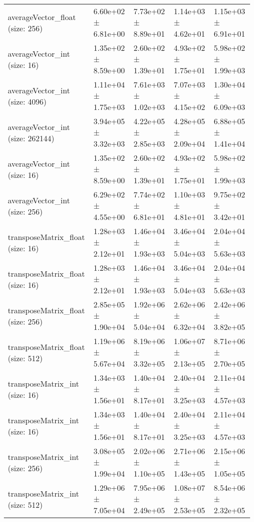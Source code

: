 \begin{tabular}{lllll}
 averageVector\_float (size: 256)       & 6.60e+02 ± 6.81e+00 & 7.73e+02 ± 8.89e+01 & 1.14e+03 ± 4.62e+01 & 1.15e+03 ± 6.91e+01 \\
 averageVector\_int (size: 16)          & 1.35e+02 ± 8.59e+00 & 2.60e+02 ± 1.39e+01 & 4.93e+02 ± 1.75e+01 & 5.98e+02 ± 1.99e+03 \\
 averageVector\_int (size: 4096)        & 1.11e+04 ± 1.75e+03 & 7.61e+03 ± 1.02e+03 & 7.07e+03 ± 4.15e+02 & 1.30e+04 ± 6.09e+03 \\
 averageVector\_int (size: 262144)      & 3.94e+05 ± 3.32e+03 & 4.22e+05 ± 2.85e+03 & 4.28e+05 ± 2.09e+04 & 6.88e+05 ± 1.41e+04 \\
 averageVector\_int (size: 16)          & 1.35e+02 ± 8.59e+00 & 2.60e+02 ± 1.39e+01 & 4.93e+02 ± 1.75e+01 & 5.98e+02 ± 1.99e+03 \\
 averageVector\_int (size: 256)         & 6.29e+02 ± 4.55e+00 & 7.74e+02 ± 6.81e+01 & 1.10e+03 ± 4.81e+01 & 9.75e+02 ± 3.42e+01 \\
 transposeMatrix\_float (size: 16)      & 1.28e+03 ± 2.12e+01 & 1.46e+04 ± 1.93e+03 & 3.46e+04 ± 5.04e+03 & 2.04e+04 ± 5.63e+03 \\
 transposeMatrix\_float (size: 16)      & 1.28e+03 ± 2.12e+01 & 1.46e+04 ± 1.93e+03 & 3.46e+04 ± 5.04e+03 & 2.04e+04 ± 5.63e+03 \\
 transposeMatrix\_float (size: 256)     & 2.85e+05 ± 1.90e+04 & 1.92e+06 ± 5.04e+04 & 2.62e+06 ± 6.32e+04 & 2.42e+06 ± 3.82e+05 \\
 transposeMatrix\_float (size: 512)     & 1.19e+06 ± 5.67e+04 & 8.19e+06 ± 3.32e+05 & 1.06e+07 ± 2.13e+05 & 8.71e+06 ± 2.70e+05 \\
 transposeMatrix\_int (size: 16)        & 1.34e+03 ± 1.56e+01 & 1.40e+04 ± 8.17e+01 & 2.40e+04 ± 3.25e+03 & 2.11e+04 ± 4.57e+03 \\
 transposeMatrix\_int (size: 16)        & 1.34e+03 ± 1.56e+01 & 1.40e+04 ± 8.17e+01 & 2.40e+04 ± 3.25e+03 & 2.11e+04 ± 4.57e+03 \\
 transposeMatrix\_int (size: 256)       & 3.08e+05 ± 1.99e+04 & 2.02e+06 ± 1.10e+05 & 2.71e+06 ± 1.43e+05 & 2.15e+06 ± 1.05e+05 \\
 transposeMatrix\_int (size: 512)       & 1.29e+06 ± 7.05e+04 & 7.95e+06 ± 2.49e+05 & 1.08e+07 ± 2.53e+05 & 8.54e+06 ± 2.32e+05 \\
\bottomrule
\end{tabular}